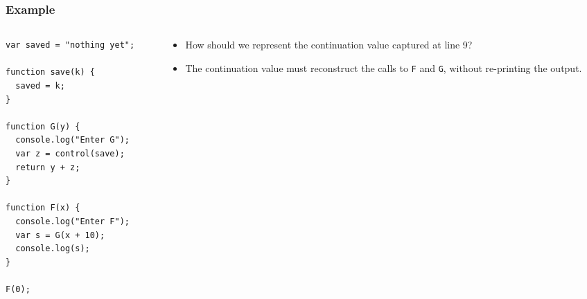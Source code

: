 \documentclass[8pt,pdf,handout]{beamer}
\begin{document}
\begin{frame}[fragile]

\frametitle{Example}

\begin{columns}

\begin{column}{0.40\textwidth}
\begin{lstlisting}
var saved = "nothing yet";

function save(k) {
  saved = k;
}

function G(y) {
  console.log("Enter G");
  var z = control(save);
  return y + z;
}

function F(x) {
  console.log("Enter F");
  var s = G(x + 10);
  console.log(s);
}

F(0);
\end{lstlisting}

\end{column}

\begin{column}{0.55\textwidth}

\begin{itemize}
    \item How should we represent the continuation value captured
    at line 9?
    \item The continuation value must reconstruct the calls to \lstinline|F|
    and \lstinline|G|, without re-printing the output.
\end{itemize}

\end{column}

\end{columns}

\end{frame}
\end{document}
